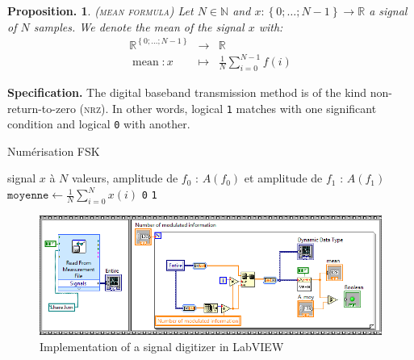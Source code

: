 \documentclass[twocolumn,pre,floats,aps,amsmath,amssymb]{revtex4}
\newtheorem{proposition}[theorem]{Proposition.}
\newenvironment{definition}[1][D\'efinition.]{\begin{trivlist}
\item[\hskip \labelsep {\bfseries #1}]}{\end{trivlist}}
\begin{document}
\begin{proposition}
  \textsc{(mean formula)}
  Let $N \in \mathbb{N}$ and $x : \left \{ 0 ; \dots ; N - 1 \right \} \rightarrow \mathbb{R}$ a signal of $N$ samples. We denote the \textit{mean of the signal} $x$ with:
  \begin{eqnarray*}
    \mathbb{R}^{\left \{ 0 ; \dots ; N - 1 \right \}} &\rightarrow& \mathbb{R}\\
    \operatorname{mean} : x &\mapsto& \frac{1}{N}\sum^{N - 1}_{i = 0}{f(i)}
  \end{eqnarray*}
\end{proposition}

\noindent
\textbf{Specification.}
  The digital baseband transmission method is of the kind non-return-to-zero (\textsc{nrz}). In other words, logical \texttt{1} matches with one significant condition and logical \texttt{0} with another.

\begin{algorithm}[h]
\caption{Num\'erisation FSK}
\label{algo_numerisation_FSK}
\begin{algorithmic}[1]
  \REQUIRE signal $x$ \`a $N$ valeurs, amplitude de $f_0$ : $A(f_0)$ et amplitude de $f_1$ : $A(f_1)$
  \STATE $\texttt{moyenne} \leftarrow \frac{1}{N}\sum^N_{i = 0}{x(i)}$
  \RETURN \texttt{0}
  \ELSE
  \RETURN \texttt{1}
  \ENDIF
\end{algorithmic}
\end{algorithm}


\begin{figure}[]
  \includegraphics[width=15cm]{pictures/numerisation_amplitude.png}
\caption{Implementation of a signal digitizer in LabVIEW}
\label{fig:algo_numerisation_FSK_labview}
\end{figure}

\end{document}
